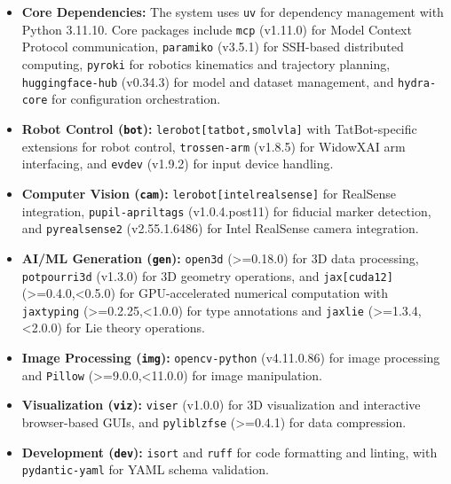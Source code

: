 \documentclass[11pt]{article}
\begin{document}
\begin{itemize}
    \item \textbf{Core Dependencies:} The system uses \texttt{uv} for dependency management with Python 3.11.10. Core packages include \texttt{mcp} (v1.11.0) for Model Context Protocol communication, \texttt{paramiko} (v3.5.1) for SSH-based distributed computing, \texttt{pyroki} for robotics kinematics and trajectory planning, \texttt{huggingface-hub} (v0.34.3) for model and dataset management, and \texttt{hydra-core} for configuration orchestration.
    
    \item \textbf{Robot Control (\texttt{bot}):} \texttt{lerobot[tatbot,smolvla]} with TatBot-specific extensions for robot control, \texttt{trossen-arm} (v1.8.5) for WidowXAI arm interfacing, and \texttt{evdev} (v1.9.2) for input device handling.
    
    \item \textbf{Computer Vision (\texttt{cam}):} \texttt{lerobot[intelrealsense]} for RealSense integration, \texttt{pupil-apriltags} (v1.0.4.post11) for fiducial marker detection, and \texttt{pyrealsense2} (v2.55.1.6486) for Intel RealSense camera integration.
    
    \item \textbf{AI/ML Generation (\texttt{gen}):} \texttt{open3d} (>=0.18.0) for 3D data processing, \texttt{potpourri3d} (v1.3.0) for 3D geometry operations, and \texttt{jax[cuda12]} (>=0.4.0,<0.5.0) for GPU-accelerated numerical computation with \texttt{jaxtyping} (>=0.2.25,<1.0.0) for type annotations and \texttt{jaxlie} (>=1.3.4,<2.0.0) for Lie theory operations.
    
    \item \textbf{Image Processing (\texttt{img}):} \texttt{opencv-python} (v4.11.0.86) for image processing and \texttt{Pillow} (>=9.0.0,<11.0.0) for image manipulation.
    
    \item \textbf{Visualization (\texttt{viz}):} \texttt{viser} (v1.0.0) for 3D visualization and interactive browser-based GUIs, and \texttt{pyliblzfse} (>=0.4.1) for data compression.
    
    \item \textbf{Development (\texttt{dev}):} \texttt{isort} and \texttt{ruff} for code formatting and linting, with \texttt{pydantic-yaml} for YAML schema validation.
\end{itemize}
\end{document}
